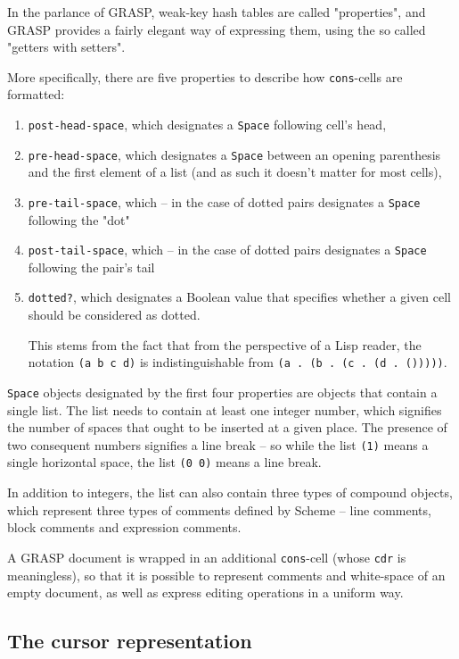 \documentclass[sigconf]{acmart}
\begin{document}
In the parlance of GRASP, weak-key hash tables are called
"properties", and GRASP provides a fairly elegant way
of expressing them, using the so called "getters with setters".

More specifically, there are five properties to describe
how \texttt{cons}-cells are formatted: 
\begin{enumerate}
\item \texttt{post-head-space}, which designates a \texttt{Space}
following cell's head,
\item \texttt{pre-head-space}, which designates 
a \texttt{Space} between an opening parenthesis 
and the first element of a list (and as such it doesn't
matter for most cells),
\item \texttt{pre-tail-space}, which -- in the case of dotted pairs
designates a \texttt{Space} following the "dot"
\item \texttt{post-tail-space}, which -- in the case of dotted pairs
designates a \texttt{Space} following the pair's tail
\item \texttt{dotted?}, which designates a Boolean value that
specifies whether a given cell should be considered as dotted.

This stems from the fact that from the perspective
of a Lisp reader, the notation \texttt{(a b c d)}
is indistinguishable from \texttt{(a . (b . (c . (d . ()))))}.
\end{enumerate}

\texttt{Space} objects designated by the first four properties
are objects that contain a single list. The list needs
to contain at least one integer number, which signifies
the number of spaces that ought to be inserted at a given
place. The presence of two consequent numbers signifies
a line break -- so while the list \texttt{(1)} means a single
horizontal space, the list \texttt{(0 0)} means a line break.

In addition to integers, the list can also contain
three types of compound objects, which represent
three types of comments defined by Scheme -- line comments,
block comments and expression comments.

A GRASP document is wrapped in an additional \texttt{cons}-cell
(whose \texttt{cdr} is meaningless), so that it is possible
to represent comments and white-space of an empty document,
as well as express editing operations in a uniform way.

\subsection{The cursor representation}
\end{document}
